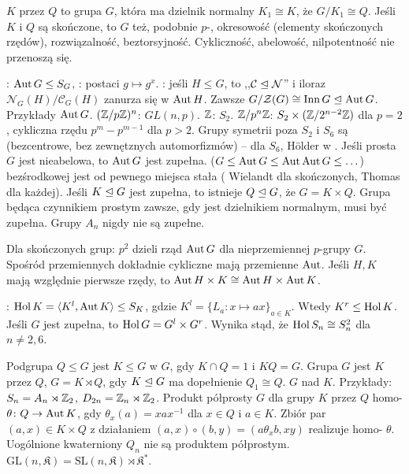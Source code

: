 {\color{Red}  $K$ przez $Q$ to grupa $G$, która ma dzielnik normalny $K_1 \cong K$, że $G / K_1 \cong Q$.
Jeśli $K$ i $Q$ są skończone, to $G$ też, podobnie $p$-, okresowość (elementy skończonych rzędów), rozwiązalność, beztorsyjność.
Cykliczność, abelowość, nilpotentność nie przenoszą się.}

:  $\operatorname{Aut} G \le S_G$, : postaci $g \mapsto g^x$.
: jeśli $H \le G$, to ,,$\mathcal C \trianglelefteq \mathcal N$'' i iloraz $\mathcal N_G(H)/\mathcal C_G(H)$ zanurza się w $\operatorname{Aut} H$.
Zawsze $G / \mathcal Z(G) \cong \operatorname{Inn} G \trianglelefteq \operatorname{Aut} G$.
Przykłady $\operatorname{Aut} G$.
$(\mathbb{Z}/p\mathbb{Z})^n$: $GL(n, p)$.
$\mathbb{Z}$: $S_2$.
$\mathbb{Z} / p^n \mathbb{Z}$: $S_2 \times (\mathbb{Z} / 2^{n-2} \mathbb{Z})$ dla $p = 2$, cykliczna rzędu $p^m - p^{m-1}$ dla $p > 2$.
Grupy symetrii poza $S_2$ i $S_6$ są  (bezcentrowe, bez zewnętznych automorfizmów) -- dla $S_6$, Hölder w .
Jeśli prosta $G$ jest nieabelowa, to $\operatorname{Aut} G$ jest zupełna.
 ($G \le \operatorname{Aut} G \le \operatorname{Aut} \operatorname{Aut} G \le \ldots$) bezśrodkowej jest od pewnego miejsca stała ( Wielandt dla skończonych,  Thomas dla każdej).
Jeśli $K \trianglelefteq G$ jest zupełna, to istnieje $Q \trianglelefteq G$, że $G = K \times Q$.
Grupa będąca czynnikiem prostym zawsze, gdy jest dzielnikiem normalnym, musi być zupełna.
Grupy $A_n$ nigdy nie są zupełne.

Dla skończonych grup: $p^2$ dzieli rząd $\operatorname{Aut} G$ dla nieprzemiennej $p$-grupy $G$.
Spośród przemiennych dokładnie cykliczne mają przemienne $\operatorname{Aut}$.
Jeśli $H, K$ mają względnie pierwsze rzędy, to $\operatorname{Aut} H \times K \cong \operatorname{Aut} H \times \operatorname{Aut} K$.

: $\operatorname{Hol} K = \langle K^l, \operatorname{Aut} K\rangle \le S_K$, gdzie $K^l = \{L_a : x \mapsto ax\}_{a \in K}$.
Wtedy $K^r \le \operatorname{Hol} K$.
Jeśli $G$ jest zupełna, to $\operatorname{Hol} G = G^l \times G^r$.
Wynika stąd, że $\operatorname{Hol} S_n \cong S_n^2$ dla $n \ne 2, 6$.


Podgrupa  $Q \le G$ jest  $K \le G$ w $G$, gdy $K \cap Q = 1$ i $KQ = G$.
Grupa $G$ jest  $K$ przez $Q$, $G = K \rtimes Q$, gdy $K \trianglelefteq G$ ma dopełnienie $Q_1 \cong Q$.
$G$  nad $K$.
Przykłady: $S_n = A_n \rtimes \mathbb{Z}_2$, $D_{2n} = \mathbb{Z}_n \rtimes \mathbb{Z}_2$.
Produkt półprosty $G$ dla grupy $K$ przez $Q$  homo- $\theta \colon Q \to \operatorname{Aut} K$, gdy $\theta_x (a) = xax^{-1}$ dla $x \in Q$ i $a \in K$.
Zbiór par $(a, x) \in K \times Q$ z działaniem $(a,x) \circ (b,y) = (a \theta_xb, xy)$ realizuje homo- $\theta$.
Uogólnione kwaterniony $Q_n$ nie są produktem półprostym.
$\textrm{GL}(n, \mathfrak K) = \textrm{SL}(n, \mathfrak K) \rtimes \mathfrak K^*$.

